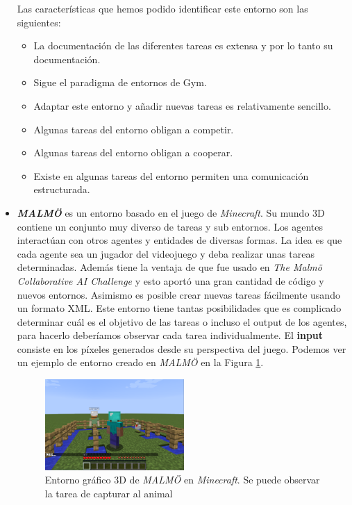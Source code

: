 \begin{itemize}
	      Las características que hemos podido identificar este entorno son las siguientes:
	      \begin{itemize}
		      \item La documentación de las diferentes tareas es extensa y por lo tanto su documentación.
		      \item Sigue el paradigma de entornos de Gym.
		      \item Adaptar este entorno y añadir nuevas tareas es relativamente sencillo.
		      \item Algunas tareas del entorno obligan a competir.
		      \item Algunas tareas del entorno obligan a cooperar.
		      \item Existe en algunas tareas del entorno permiten una comunicación estructurada.
	      \end{itemize}

	\item \textbf{\textit{MALMÖ}} \cite {malmo} es un entorno basado en el juego de \textit{Minecraft}. Su mundo 3D contiene un conjunto muy diverso de tareas y sub entornos. Los agentes interactúan con otros agentes y entidades de diversas formas. La idea es que cada agente sea un jugador del videojuego y deba realizar unas tareas determinadas. Además tiene la ventaja de que fue usado en \textit{The Malmö Collaborative AI Challenge} y esto aportó una gran cantidad de código y nuevos entornos. Asimismo es posible crear nuevas tareas fácilmente usando un formato XML. Este entorno tiene tantas posibilidades que es complicado determinar cuál es el objetivo de las tareas o incluso el output de los agentes, para hacerlo deberíamos observar cada tarea individualmente. El \textbf{input} consiste en los píxeles generados desde su perspectiva del juego. Podemos ver un ejemplo de entorno creado en \textit{MALMÖ} en la Figura \ref {fig:malmo}.
	      \begin{figure}[h]
		      \centering
		      \includegraphics[width=0.5\textwidth]{img/mobchase.png}
		      \caption{Entorno gráfico 3D de \textit{MALMÖ} en \textit{Minecraft}. Se puede observar la tarea de capturar al animal \cite {malmo}}
		      \label{fig:malmo}
	      \end{figure}


\end{itemize}
